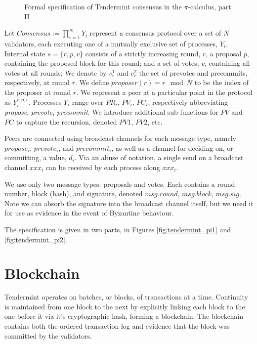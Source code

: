\begin{figure}[]
    	\centering
	
	\caption[Formal specification of Tendermint consensus in the $\pi$-calculus, part II]{Formal specification of Tendermint consensus in the $\pi$-calculus, part II}
	\label{fig:tendermint_pi}
\end{figure}


Let $Consensus := \prod_{i=1}^N Y_i $ represent a consensus protocol
over a set of $N$ validators, each executing one of a mutually exclusive set of processes, $Y_i$.
Internal state $s = \{r, p, v \}$ consists of a strictly increasing round, $r$,
a proposal $p$, containing the proposed block for this round;
and a set of votes, $v$, containing all votes at all rounds;
We denote by $v_r^1$ and $v_r^2$ the set of prevotes and precommits, respectively, at round $r$.
We define $proposer(r) = r \mod N$ to be the index of the proposer at round $r$.
We represent a peer at a particular point in the protocol as $Y_i^{r, p, v}$.
Processes $Y_i$ range over $PR_i$, $PV_i$, $PC_i$, 
respectively abbreviating 
\emph{propose}, \emph{prevote}, \emph{precommit}.
We introduce additional sub-functions for $PV$ and $PC$ to capture the recursion,
denoted $PV1$, $PV2$, etc.

Peers are connected using broadcast channels for each message type,
namely $propose_i$, $prevote_i$, and $precommit_i$,
as well as a channel for deciding on, or committing, a value, $d_i$.
Via an abuse of notation, a single send on a broadcast channel $xxx_i$ can be received by each process along
$xxx_i$.

We use only two message types: proposals and votes. 
Each contains a round number, block (hash), and signature, 
denoted $msg.round$, $msg.block$, $msg.sig$.
Note we can absorb the signature into the broadcast channel itself,
but we need it for use as evidence in the event of Byzantine behaviour.

The specification is given in two parts, in Figures \ref{fig:tendermint_pi1} and \ref{fig:tendermint_pi2}.

\section{Blockchain}

Tendermint operates on batches, or blocks, of transactions at a time.
Continuity is maintained from one block to the next by explicitly linking each block to the one before it 
via it's cryptographic hash, forming a blockchain. 
The blockchain contains both the ordered transaction log and evidence that the block was committed 
by the validators.


